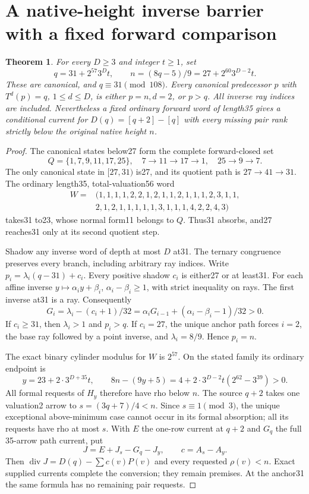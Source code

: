 \documentclass[11pt]{article}
\newtheorem{theorem}{Theorem}
\begin{document}
\section{A native-height inverse barrier with a fixed forward comparison}
\begin{theorem}\label{thm:nativeheight}
For every $D\ge3$ and integer $t\ge1$, set
\[
 q=31+2^{57}3^Dt,\qquad
 n=(8q-5)/9=27+2^{60}3^{D-2}t.
\]
These are canonical, and $q\equiv31\pmod{108}$. Every canonical
predecessor $p$ with $T^d(p)=q$, $1\le d\le D$, is either
$p=n,d=2$, or $p>q$. All inverse ray indices are included.
Nevertheless a fixed ordinary forward word of length35 gives a
conditional current for $D(q)=[q+2]-[q]$ with every missing pair
rank strictly below the original native height $n$.
\end{theorem}
\begin{proof}
The canonical states below27 form the complete forward-closed set
\[
 Q=\{1,7,9,11,17,25\},\quad
 7\to11\to17\to1,\quad25\to9\to7.
\]
The only canonical state in $[27,31)$ is27, and its quotient path is
$27\to41\to31$. The ordinary length35, total-valuation56 word
\[
 \begin{split}
 W={}&(1,1,1,1,2,2,1,2,1,1,2,1,1,1,2,3,1,1,\\
      &2,1,2,1,1,1,1,1,3,1,1,1,4,2,2,4,3)
 \end{split}
\]
takes31 to23, whose normal form11 belongs to $Q$. Thus31 absorbs,
and27 reaches31 only at its second quotient step.

Shadow any inverse word of depth at most $D$ at31. The ternary
congruence preserves every branch, including arbitrary ray indices.
Write $p_i=\lambda_i(q-31)+c_i$. Every positive shadow $c_i$ is
either27 or at least31. For each affine inverse
$y\mapsto\alpha_i y+\beta_i$, $\alpha_i-\beta_i\ge1$, with strict
inequality on rays. The first inverse at31 is a ray. Consequently
\[
 G_i=\lambda_i-(c_i+1)/32
     =\alpha_iG_{i-1}+(\alpha_i-\beta_i-1)/32>0.
\]
If $c_i\ge31$, then $\lambda_i>1$ and $p_i>q$. If $c_i=27$, the
unique anchor path forces $i=2$, the base ray followed by a point
inverse, and $\lambda_i=8/9$. Hence $p_i=n$.

The exact binary cylinder modulus for $W$ is $2^{57}$. On the stated
family its ordinary endpoint is
\[
 y=23+2\cdot3^{D+35}t,\qquad
 8n-(9y+5)=4+2\cdot3^{D-2}t(2^{62}-3^{39})>0.
\]
All formal requests of $H_y$ therefore have rho below $n$. The source
$q+2$ takes one valuation2 arrow to $s=(3q+7)/4<n$.
Since $s\equiv1\pmod3$, the unique exceptional above-minimum case
cannot occur in its formal absorption; all its requests have rho at
most $s$. With $E$ the one-row current at $q+2$ and $G_q$ the full
35-arrow path current, put
\[
 J=E+J_s-G_q-J_y,\qquad c=A_s-A_y.
\]
Then $\operatorname{div}J=D(q)-\sum c(v)P(v)$ and every requested
$\rho(v)<n$. Exact supplied currents complete the conversion; they
remain premises. At the anchor31 the same formula has no remaining
pair requests.
\end{proof}
\end{document}
